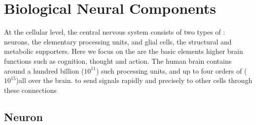 \section{Biological Neural Components}
\label{sec:bio_neuron}
At the cellular level, the central nervous system consists of two types of \DIFdelbegin {}\DIFdelend \DIFaddbegin {}\DIFaddend : neurons, the elementary processing units, and glial cells, the structural and metabolic supporters. 
Here we focus on the \DIFdelbegin {}\DIFdelend \DIFaddbegin {}\DIFaddend are the basic elements \DIFdelbegin {}\DIFdelend \DIFaddbegin {}\DIFaddend higher brain functions such as cognition, thought and action. %
The human brain contains around a hundred billion ($10^{11}$) such processing units, and up to four orders of \DIFdelbegin {}\DIFdelend \DIFaddbegin {}\DIFaddend ($10^{15}$)\DIFaddbegin \DIFadd{, }\DIFaddend all over the brain.
\DIFdelbegin {}\DIFdelend \DIFaddbegin {}\DIFaddend to send signals rapidly and precisely to other cells through these connections\DIFdelbegin {}\DIFdelend \DIFaddbegin {}\DIFaddend \subsection{Neuron}
